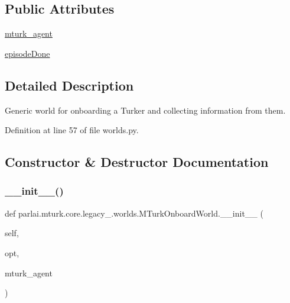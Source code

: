 \subsection*{Public Attributes}
\begin{DoxyCompactItemize}
\item 
\hyperlink{classparlai_1_1mturk_1_1core_1_1legacy__2018_1_1worlds_1_1MTurkOnboardWorld_a434294c870fa0b31b2889eb1f384e408}{mturk\+\_\+agent}
\item 
\hyperlink{classparlai_1_1mturk_1_1core_1_1legacy__2018_1_1worlds_1_1MTurkOnboardWorld_af559fbe40e694152eb7e1531cddc1cc7}{episode\+Done}
\end{DoxyCompactItemize}


\subsection{Detailed Description}
\begin{DoxyVerb}Generic world for onboarding a Turker and collecting information from them.
\end{DoxyVerb}
 

Definition at line 57 of file worlds.\+py.



\subsection{Constructor \& Destructor Documentation}
\mbox{\label{classparlai_1_1mturk_1_1core_1_1legacy__2018_1_1worlds_1_1MTurkOnboardWorld_ab513ad6fb58f11f9f30f0bd73e0b6b51}} 
\subsubsection{\texorpdfstring{\+\_\+\+\_\+init\+\_\+\+\_\+()}{\_\_init\_\_()}}
{\footnotesize\ttfamily def parlai.\+mturk.\+core.\+legacy\+\_.\+worlds.\+M\+Turk\+Onboard\+World.\+\_\+\+\_\+init\+\_\+\+\_\+ (\begin{DoxyParamCaption}\item[{}]{self,  }\item[{}]{opt,  }\item[{}]{mturk\+\_\+agent }\end{DoxyParamCaption})}

